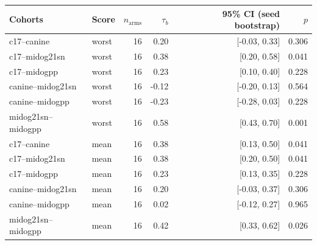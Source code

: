 \begin{tabular}{llrrrr}
\toprule
Cohorts & Score & $n_\text{arms}$ & $\tau_b$ & 95\% CI (seed bootstrap) & $p$ \\
\midrule
c17--canine & worst & 16 & 0.20 & [-0.03, 0.33] & 0.306 \\
c17--midog21sn & worst & 16 & 0.38 & [0.20, 0.58] & 0.041 \\
c17--midogpp & worst & 16 & 0.23 & [0.10, 0.40] & 0.228 \\
canine--midog21sn & worst & 16 & -0.12 & [-0.20, 0.13] & 0.564 \\
canine--midogpp & worst & 16 & -0.23 & [-0.28, 0.03] & 0.228 \\
midog21sn--midogpp & worst & 16 & 0.58 & [0.43, 0.70] & 0.001 \\
c17--canine & mean & 16 & 0.38 & [0.13, 0.50] & 0.041 \\
c17--midog21sn & mean & 16 & 0.38 & [0.20, 0.50] & 0.041 \\
c17--midogpp & mean & 16 & 0.23 & [0.13, 0.35] & 0.228 \\
canine--midog21sn & mean & 16 & 0.20 & [-0.03, 0.37] & 0.306 \\
canine--midogpp & mean & 16 & 0.02 & [-0.12, 0.27] & 0.965 \\
midog21sn--midogpp & mean & 16 & 0.42 & [0.33, 0.62] & 0.026 \\
\bottomrule
\end{tabular}
